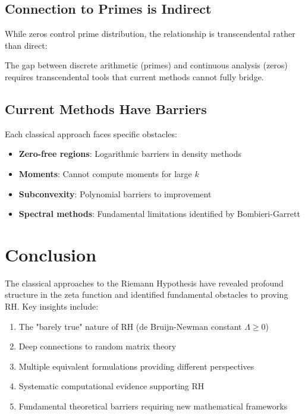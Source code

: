 \subsection{Connection to Primes is Indirect}

While zeros control prime distribution, the relationship is transcendental rather than direct:

\begin{remark}
The gap between discrete arithmetic (primes) and continuous analysis (zeros) requires transcendental tools that current methods cannot fully bridge.
\end{remark}

\subsection{Current Methods Have Barriers}

Each classical approach faces specific obstacles:
\begin{itemize}
\item \textbf{Zero-free regions}: Logarithmic barriers in density methods
\item \textbf{Moments}: Cannot compute moments for large $k$
\item \textbf{Subconvexity}: Polynomial barriers to improvement
\item \textbf{Spectral methods}: Fundamental limitations identified by Bombieri-Garrett
\end{itemize}

\section{Conclusion}

The classical approaches to the Riemann Hypothesis have revealed profound structure in the zeta function and identified fundamental obstacles to proving RH. Key insights include:

\begin{enumerate}
\item The "barely true" nature of RH (de Bruijn-Newman constant $\Lambda \geq 0$)
\item Deep connections to random matrix theory
\item Multiple equivalent formulations providing different perspectives
\item Systematic computational evidence supporting RH
\item Fundamental theoretical barriers requiring new mathematical frameworks
\end{enumerate}

